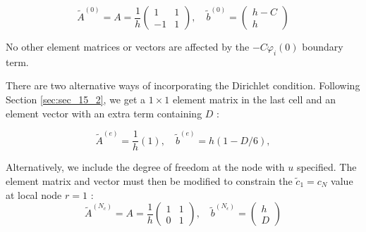 \documentclass[../main.tex]{subfiles}
\begin{document}
		\begin{equation}
			\label{eqa193}
			\tilde{A}^{(0)}=A=\frac{1}{h}\left(\begin{array}{rr}
				1 & 1 \\
				-1 & 1
			\end{array}\right), \quad \tilde{b}^{(0)}=\left(\begin{array}{c}
				h-C \\
				h
			\end{array}\right)
		\end{equation}
	
		\noindent No other element matrices or vectors are affected by the $-C \varphi_{i}(0)$ boundary term.
		
		There are two alternative ways of incorporating the Dirichlet condition. Following Section \ref{sec:sec_15_2}, we get a $1 \times 1$ element matrix in the last cell and an element vector with an extra term containing $D$ :
	
		\begin{equation}
			\label{eqa194}
			\tilde{A}^{(e)}=\frac{1}{h}(1), \quad \tilde{b}^{(e)}=h(1-D / 6),
		\end{equation}
	
		Alternatively, we include the degree of freedom at the node with $u$ specified. The element matrix and vector must then be modified to constrain the $\tilde{c}_{1}=c_{N}$ value at local node $r=1$ :
		\begin{equation}
			\label{eqa195}
			\tilde{A}^{\left(N_{c}\right)}=A=\frac{1}{h}\left(\begin{array}{ll}
				1 & 1 \\
				0 & 1
			\end{array}\right), \quad \tilde{b}^{\left(N_{\epsilon}\right)}=\left(\begin{array}{c}
				h \\
				D
			\end{array}\right)
		\end{equation}
	
		
	
\clearpage
\end{document}
